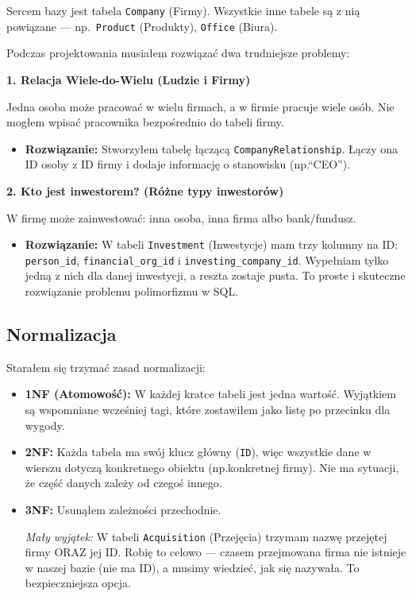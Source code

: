 \documentclass[12pt,a4paper]{article}
\begin{document}
Sercem bazy jest tabela \texttt{Company} (Firmy). Wszystkie inne tabele są z nią powiązane --- np.\ \texttt{Product} (Produkty), \texttt{Office} (Biura).

Podczas projektowania musiałem rozwiązać dwa trudniejsze problemy:

\textbf{1. Relacja Wiele-do-Wielu (Ludzie i Firmy)}

Jedna osoba może pracować w wielu firmach, a w firmie pracuje wiele osób. Nie mogłem wpisać pracownika bezpośrednio do tabeli firmy.

\begin{itemize}[noitemsep]
    \item \textbf{Rozwiązanie:} Stworzyłem tabelę łączącą \texttt{CompanyRelationship}. Łączy ona ID osoby z ID firmy i dodaje informację o stanowisku (np.\@ ``CEO'').
\end{itemize}

\textbf{2. Kto jest inwestorem? (Różne typy inwestorów)}

W firmę może zainwestować: inna osoba, inna firma albo bank/fundusz.

\begin{itemize}[noitemsep]
    \item \textbf{Rozwiązanie:} W tabeli \texttt{Investment} (Inwestycje) mam trzy kolumny na ID: \texttt{person\_id}, \texttt{financial\_org\_id} i \texttt{investing\_company\_id}. Wypełniam tylko jedną z nich dla danej inwestycji, a reszta zostaje pusta. To proste i skuteczne rozwiązanie problemu polimorfizmu w SQL.
\end{itemize}

\subsection{Normalizacja}

Starałem się trzymać zasad normalizacji:

\begin{itemize}[noitemsep]
    \item \textbf{1NF (Atomowość):} W każdej kratce tabeli jest jedna wartość. Wyjątkiem są wspomniane wcześniej tagi, które zostawiłem jako listę po przecinku dla wygody.
    \item \textbf{2NF:} Każda tabela ma swój klucz główny (\texttt{ID}), więc wszystkie dane w wierszu dotyczą konkretnego obiektu (np.\@ konkretnej firmy). Nie ma sytuacji, że część danych zależy od czegoś innego.
    \item \textbf{3NF:} Usunąłem zależności przechodnie.

    \textit{Mały wyjątek:} W tabeli \texttt{Acquisition} (Przejęcia) trzymam nazwę przejętej firmy ORAZ jej ID. Robię to celowo --- czasem przejmowana firma nie istnieje w naszej bazie (nie ma ID), a musimy wiedzieć, jak się nazywała. To bezpieczniejsza opcja.
\end{itemize}
\end{document}
